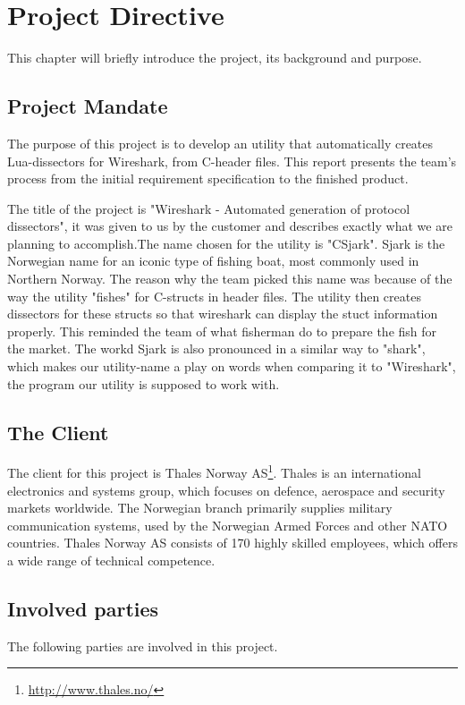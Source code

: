 \chapter{Project Directive}
This chapter will briefly introduce the project, its background and purpose.


\section{Project Mandate}
The purpose of this project is to develop an utility that automatically creates Lua-dissectors for Wireshark, from C-header files. This report presents the team’s process from the initial requirement specification to the finished product. 

The title of the project is "Wireshark - Automated generation of protocol dissectors", it was given to us by the customer and describes exactly what we are planning
to accomplish.The name chosen for the utility is "CSjark". Sjark is the Norwegian name for an iconic type of fishing boat, most commonly used in Northern Norway. The reason why the team picked this name was because of the way the utility "fishes" for C-structs in header files. The utility then creates dissectors for these structs so that wireshark can display the stuct information properly. This reminded the team of what fisherman do to prepare the fish for the market. The workd Sjark is also pronounced in a similar way to "shark", which makes our utility-name a play on words when comparing it to "Wireshark", the program our utility is supposed to work with.


\section{The Client}
The client for this project is
Thales Norway AS\footnote{\url{http://www.thales.no/}}. Thales is an
international electronics and systems group, which focuses on defence,
aerospace and security markets worldwide. The Norwegian branch primarily
supplies military communication systems, used by the Norwegian Armed Forces
and other NATO countries. Thales Norway AS consists of 170 highly skilled
employees, which offers a wide range of technical competence.


\section{Involved parties}
The following parties are involved in this project.

